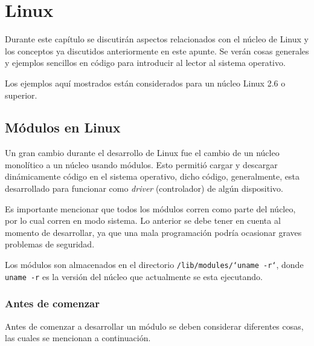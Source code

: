 %
%
%
%

\chapter{Linux}
\label{linux}
Durante este capítulo se discutirán aspectos relacionados con el núcleo de Linux y los conceptos ya discutidos anteriormente en este apunte. Se verán cosas generales y ejemplos sencillos en código para introducir al lector al sistema operativo.

Los ejemplos aquí mostrados están considerados para un núcleo Linux 2.6 o superior.

\section{Módulos en Linux}
\label{linux_modulos}

Un gran cambio durante el desarrollo de Linux fue el cambio de un núcleo monolítico a un núcleo usando módulos. Esto permitió cargar y descargar dinámicamente código en el sistema operativo, dicho código, generalmente, esta desarrollado para funcionar como \textit{driver} (controlador) de algún dispositivo.

Es importante mencionar que todos los módulos corren como parte del núcleo, por lo cual corren en modo sistema. Lo anterior se debe tener en cuenta al momento de desarrollar, ya que una mala programación podría ocasionar graves problemas de seguridad.

Los módulos son almacenados en el directorio \texttt{/lib/modules/`uname -r`}, donde \texttt{uname -r} es la versión del núcleo que actualmente se esta ejecutando.

\subsection{Antes de comenzar}
Antes de comenzar a desarrollar un módulo se deben considerar diferentes cosas, las cuales se mencionan a continuación.

